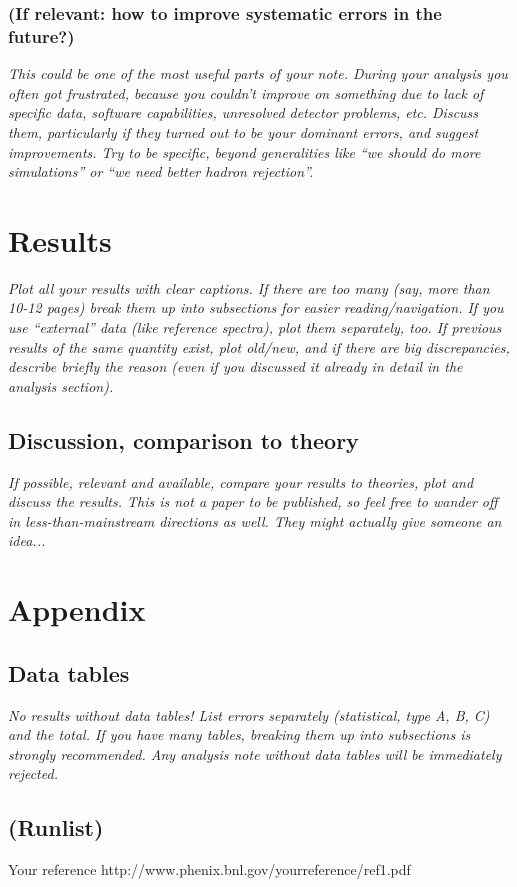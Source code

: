 \documentclass[12pt]{article}
\begin{document}
\subsubsection{(If relevant: how to improve systematic errors in the future?)}

{\it
  This could be one of the most useful parts of your note.
  During your analysis you often got frustrated, because you couldn't
  improve on something due to lack of specific data, software
  capabilities, unresolved detector problems, etc.  Discuss them,
  particularly if they turned out to be your dominant errors, and
  suggest improvements.
  Try to be specific, beyond generalities like ``we should do more 
  simulations'' or  ``we need better hadron rejection''.
}


\section{Results}

{\it
  Plot all your results with clear captions.  If there are too many
  (say, more than 10-12 pages) break them
  up into subsections for easier reading/navigation.  If you use
  ``external'' data (like reference spectra), plot them separately,
  too.  If previous results of the same quantity exist, plot old/new,
  and if there are big discrepancies, describe briefly the reason (even
  if you discussed it already in detail in the analysis section).
}

\subsection{Discussion, comparison to theory}
{\it
  If possible, relevant and available, compare your results to theories, 
  plot and discuss the results.  This is not a paper to be published, 
  so feel free to wander off in less-than-mainstream directions as well.
  They might actually give someone an idea...
}


\section{Appendix}

\subsection{Data tables}
{\it
  No results without data tables!  List errors separately
  (statistical, type A, B, C) and the total.  If you have many tables,
  breaking them up into subsections is strongly recommended.
  Any analysis note without data tables will be immediately rejected.
}



\subsection{(Runlist)}



\begin{thebibliography}{9}

 Your reference
{\rm http://www.phenix.bnl.gov/yourreference/ref1.pdf}


\end{thebibliography}
\end{document}
